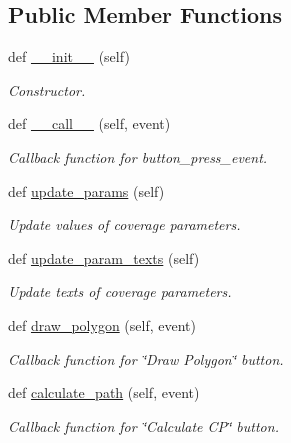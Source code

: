 \subsection*{Public Member Functions}
\begin{DoxyCompactItemize}
\item 
def \hyperlink{classspecify__rect_1_1_polygon_builder_aaa9568fcee5300e9b5a2cdadde5eddc4}{\+\_\+\+\_\+init\+\_\+\+\_\+} (self)
\begin{DoxyCompactList}\small\item\em Constructor. \end{DoxyCompactList}\item 
def \hyperlink{classspecify__rect_1_1_polygon_builder_a599e6951c9903fcc04da12f40451ac74}{\+\_\+\+\_\+call\+\_\+\+\_\+} (self, event)
\begin{DoxyCompactList}\small\item\em Callback function for button\+\_\+press\+\_\+event. \end{DoxyCompactList}\item 
def \hyperlink{classspecify__rect_1_1_polygon_builder_a49cc71d22b56e37306ff049108811f70}{update\+\_\+params} (self)
\begin{DoxyCompactList}\small\item\em Update values of coverage parameters. \end{DoxyCompactList}\item 
def \hyperlink{classspecify__rect_1_1_polygon_builder_a5d01b120abbd492ab7ab859b23953f73}{update\+\_\+param\+\_\+texts} (self)
\begin{DoxyCompactList}\small\item\em Update texts of coverage parameters. \end{DoxyCompactList}\item 
def \hyperlink{classspecify__rect_1_1_polygon_builder_a3a609f5f4f9a09d5fabc4b44fcaf986d}{draw\+\_\+polygon} (self, event)
\begin{DoxyCompactList}\small\item\em Callback function for \char`\"{}\+Draw Polygon\char`\"{} button. \end{DoxyCompactList}\item 
def \hyperlink{classspecify__rect_1_1_polygon_builder_aad6032c57e31102d9b5f522f3a5a88e7}{calculate\+\_\+path} (self, event)
\begin{DoxyCompactList}\small\item\em Callback function for \char`\"{}\+Calculate C\+P\char`\"{} button. \end{DoxyCompactList}\item 

\end{DoxyCompactItemize}
